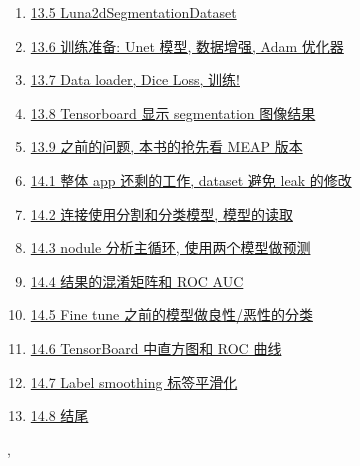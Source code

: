 \documentclass[11pt]{article}
\renewcommand{\today}{\shortmonthname[\the\month] \the \day,  \the\year}
\begin{document}
\begin{enumerate}
	\item \href{https://mp.weixin.qq.com/s/1OjKDD8oJY0sI6kAERE10A}{13.5 Luna2dSegmentationDataset}	%
	\item \href{https://mp.weixin.qq.com/s/-JjDf_BtB53sCdyLgIvmxg}{13.6 训练准备: Unet 模型, 数据增强, Adam 优化器}	%
	\item \href{https://mp.weixin.qq.com/s/Fplkh2gBhFT7jqjaGMf-pA}{13.7 Data loader, Dice Loss, 训练!}	%
	\item \href{https://mp.weixin.qq.com/s/iXBZWaESuz5-RnxLDZmnIg}{13.8 Tensorboard 显示 segmentation 图像结果}	%
	\item \href{https://mp.weixin.qq.com/s/PxIMdRbtdxER8dASkXd3Hg}{13.9 之前的问题, 本书的抢先看 MEAP 版本}	%
	\item \href{https://mp.weixin.qq.com/s/OqWj7TkOxfxr-AmBWQgU7w}{14.1 整体 app 还剩的工作, dataset 避免 leak 的修改}	%
	\item \href{https://mp.weixin.qq.com/s/ncCBnC5OcjYccLQypv-6VQ}{14.2 连接使用分割和分类模型, 模型的读取}	%
	\item \href{https://mp.weixin.qq.com/s/aUyxMsG5CVsbUGOUGUXAxA}{14.3 nodule 分析主循环, 使用两个模型做预测}	%
	\item \href{https://mp.weixin.qq.com/s/4QbW1jKzunJRagQHA40usQ}{14.4 结果的混淆矩阵和 ROC AUC}	%
	\item \href{https://mp.weixin.qq.com/s/BhvLHM3M-IxPSTXmYfIMfQ}{14.5 Fine tune 之前的模型做良性/恶性的分类}	%
	\item \href{https://mp.weixin.qq.com/s/14XGf6vGCA1_7hyu0I5fmQ}{14.6 TensorBoard 中直方图和 ROC 曲线}	%
	\item \href{URL}{14.7 Label smoothing 标签平滑化}	%
	\item \href{URL}{14.8 结尾}	%
\end{enumerate}




%
\begin{flushright}
	\tiny \today 
\end{flushright}
\end{document}
